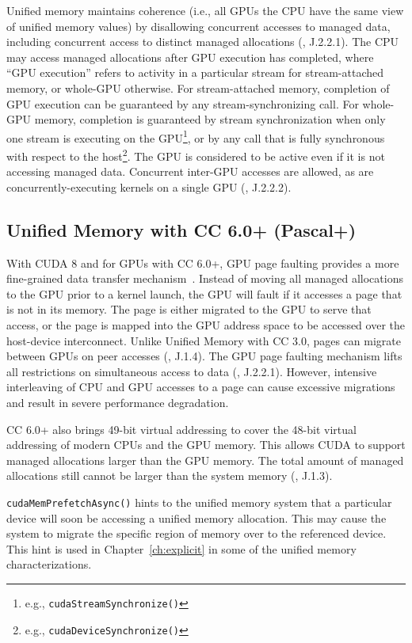 Unified memory maintains coherence (i.e., all GPUs the CPU have the same view of unified memory values) by disallowing concurrent accesses to managed data, including concurrent access to distinct managed allocations (\cite{nvidia2014cuda60}, J.2.2.1).
The CPU may access managed allocations after GPU execution has completed, where ``GPU execution'' refers to activity in a particular stream for stream-attached memory, or whole-GPU otherwise.
For stream-attached memory, completion of GPU execution can be guaranteed by any stream-synchronizing call.
For whole-GPU memory, completion is guaranteed by stream synchronization when only one stream is executing on the GPU\footnote{e.g., \texttt{cudaStreamSynchronize()}}, or by any call that is fully synchronous with respect to the host\footnote{e.g., \texttt{cudaDeviceSynchronize()}}.
The GPU is considered to be active even if it is not accessing managed data.
Concurrent inter-GPU accesses are allowed, as are concurrently-executing kernels on a single GPU (\cite{nvidia2014cuda60}, J.2.2.2).

\subsection{Unified Memory with CC 6.0+ (Pascal+)}
\label{sec:unified-cc6}

With CUDA 8 and for GPUs with CC 6.0+, GPU page faulting provides a more fine-grained data transfer mechanism~\cite{nvidia2017cuda80}.
Instead of moving all managed allocations to the GPU prior to a kernel launch, the GPU will fault if it accesses a page that is not in its memory.
The page is either migrated to the GPU to serve that access, or the page is mapped into the GPU address space to be accessed over the host-device interconnect.
Unlike Unified Memory with CC 3.0, pages can migrate between GPUs on peer accesses (\cite{nvidia2017cuda80}, J.1.4).
The GPU page faulting mechanism lifts all restrictions on simultaneous access to data (\cite{nvidia2017cuda80}, J.2.2.1).
However, intensive interleaving of CPU and GPU accesses to a page can cause excessive migrations and result in severe performance degradation.

CC 6.0+ also brings 49-bit virtual addressing to cover the 48-bit virtual addressing of modern CPUs and the GPU memory.
This allows CUDA to support managed allocations larger than the GPU memory.
The total amount of managed allocations still cannot be larger than the system memory (\cite{nvidia2017cuda80}, J.1.3).

\texttt{cudaMemPrefetchAsync()} hints to the unified memory system that a particular device will soon be accessing a unified memory allocation.
This may cause the system to migrate the specific region of memory over to the referenced device.
This hint is used in Chapter~\ref{ch:explicit} in some of the unified memory characterizations.

